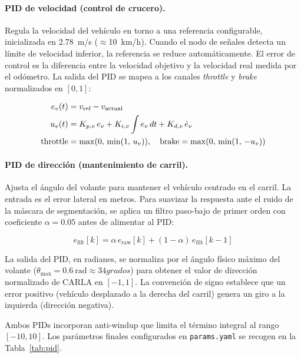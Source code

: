 \documentclass[12pt, a4paper]{article}
\begin{document}
\paragraph{PID de velocidad (control de crucero).}
Regula la velocidad del vehículo en torno a una referencia configurable, inicializada en 2.78~m/s ($\approx$10~km/h). Cuando el nodo de señales detecta un límite de velocidad inferior, la referencia se reduce automáticamente. El error de control es la diferencia entre la velocidad objetivo y la velocidad real medida por el odómetro. La salida del PID se mapea a los canales \textit{throttle} y \textit{brake} normalizados en $[0, 1]$:

\begin{align}
    e_v(t) &= v_{\text{ref}} - v_{\text{actual}} \notag \\
    u_v(t) &= K_{p,v}\,e_v + K_{i,v}\int e_v\,dt + K_{d,v}\,\dot{e}_v \notag \\
    \text{throttle} &= \max(0,\,\min(1,\, u_v)), \quad
    \text{brake} = \max(0,\,\min(1,\,-u_v)) \notag
\end{align}

\paragraph{PID de dirección (mantenimiento de carril).}
Ajusta el ángulo del volante para mantener el vehículo centrado en el carril. La entrada es el error lateral en metros. Para suavizar la respuesta ante el ruido de la máscara de segmentación, se aplica un filtro paso-bajo de primer orden con coeficiente $\alpha = 0.05$ antes de alimentar al PID:

\begin{equation}
    e_{\text{filt}}[k] = \alpha\,e_{\text{raw}}[k] + (1 - \alpha)\,e_{\text{filt}}[k-1]
\end{equation}

La salida del PID, en radianes, se normaliza por el ángulo físico máximo del volante ($\theta_{\max} = 0.6~\text{rad} \approx 34 grados$) para obtener el valor de dirección normalizado de CARLA en $[-1,1]$. La convención de signo establece que un error positivo (vehículo desplazado a la derecha del carril) genera un giro a la izquierda (dirección negativa).

Ambos PIDs incorporan anti-windup que limita el término integral al rango $[-10, 10]$. Los parámetros finales configurados en \texttt{params.yaml} se recogen en la Tabla~\ref{tab:pid}.
\end{document}
